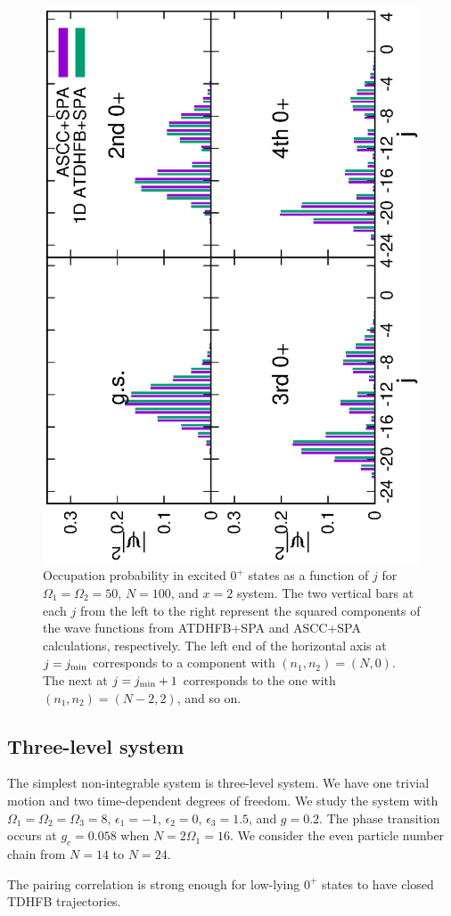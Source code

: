 \documentclass[%
superscriptaddress,
showpacs,
nofootinbib,
amsmath,amssymb,
aps,
prc,
twocolumn,
floatfix ]%
{revtex4-1}
\begin{document}
\begin{figure}[thb]
 \begin{center}
   \includegraphics[height=0.5\textwidth,angle=-90]{N100Xeq2occ.eps}
 \end{center}
	\caption{Occupation probability in excited $0^+$ states
as a function of $j$ for $\Omega_1=\Omega_2=50$, $N=100$, and $x=2$ system.
The two vertical bars at each $j$ from the left to the right represent
the squared components of the wave functions
from ATDHFB+SPA and ASCC+SPA calculations, respectively.
The left end of the horizontal axis at $j=j_{\rm min}$
corresponds to a component with $(n_1,n_2)=(N,0)$.
The next at $j=j_{\rm min}+1$ corresponds to the one with
$(n_1,n_2)=(N-2,2)$, and so on.
}
 \label{fig:N100_occ}
\end{figure}


\subsection{Three-level system}
The simplest non-integrable system is three-level system. We have one trivial motion and two time-dependent degrees of freedom. We study the system with $\Omega_1=\Omega_2=\Omega_3=8$, $\epsilon_1=-1$, $\epsilon_2=0$, $\epsilon_3=1.5$, and $g=0.2$. The phase transition occurs at $g_c=0.058$ when $N=2\Omega_1=16$. We consider the even particle number chain from $N=14$ to $N=24$. 


The pairing correlation is strong enough for low-lying $0^+$ states to have closed TDHFB trajectories.
\end{document}
